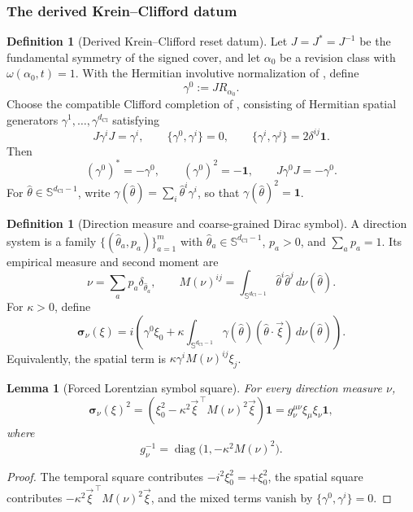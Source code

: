 \documentclass[11pt]{article}
\newtheorem{lemma}[theorem]{Lemma}
\theoremstyle{definition}
\newtheorem{definition}[theorem]{Definition}
\theoremstyle{remark}
\newcommand{\dCl}{d_{\mathrm{Cl}}}
\newcommand{\Sphere}{\mathbb{S}}
\newcommand{\sym}{\boldsymbol{\sigma}}
\newcommand{\one}{\mathbf{1}}
\begin{document}
\subsubsection{The derived Krein--Clifford datum}

\begin{definition}[Derived Krein--Clifford reset datum]
\label{def:krein-clifford}
Let \(J=J^*=J^{-1}\) be the fundamental symmetry of the signed cover, and let
\(\alpha_0\) be a revision class with \(\omega(\alpha_0,t)=1\).  With the
Hermitian involutive normalization of
, define
\[
  \gamma^0:=J R_{\alpha_0}.
\]
Choose the compatible Clifford completion of
, consisting of Hermitian spatial
generators \(\gamma^1,\ldots,\gamma^{\dCl}\) satisfying
\[
  J\gamma^iJ=\gamma^i,
  \qquad
  \{\gamma^0,\gamma^i\}=0,
  \qquad
  \{\gamma^i,\gamma^j\}=2\delta^{ij}\one.
\]
Then
\[
  (\gamma^0)^*=-\gamma^0,
  \qquad
  (\gamma^0)^2=-\one,
  \qquad
  J\gamma^0J=-\gamma^0.
\]
For \(\hat\theta\in\Sphere^{\dCl-1}\), write
\(\gamma(\hat\theta)=\sum_i\hat\theta^i\gamma^i\), so that
\(\gamma(\hat\theta)^2=\one\).
\end{definition}

\begin{definition}[Direction measure and coarse-grained Dirac symbol]
\label{def:dirac-symbol}
A direction system is a family
\(\{(\hat\theta_a,p_a)\}_{a=1}^{m}\) with
\(\hat\theta_a\in\Sphere^{\dCl-1}\), \(p_a>0\), and
\(\sum_a p_a=1\).  Its empirical measure and second moment are
\[
  \nu=\sum_a p_a\delta_{\hat\theta_a},
  \qquad
  M(\nu)^{ij}=\int_{\Sphere^{\dCl-1}}
  \hat\theta^i\hat\theta^j\,d\nu(\hat\theta).
\]
For \(\kappa>0\), define
\[
  \sym_\nu(\xi)
  =i\left(
     \gamma^0\xi_0+
     \kappa\int_{\Sphere^{\dCl-1}}
     \gamma(\hat\theta)(\hat\theta\cdot\vec\xi)
     \,d\nu(\hat\theta)
   \right).
\]
Equivalently, the spatial term is
\(\kappa\gamma^iM(\nu)^{ij}\xi_j\).
\end{definition}

\begin{lemma}[Forced Lorentzian symbol square]
\label{lem:symbol-square}
For every direction measure \(\nu\),
\[
  \sym_\nu(\xi)^2
  =\left(
      \xi_0^2-\kappa^2\vec\xi^{\,\top}M(\nu)^2\vec\xi
    \right)\one
  =g_\nu^{\mu\nu}\xi_\mu\xi_\nu\one,
\]
where
\[
  g_\nu^{-1}=\operatorname{diag}
  \bigl(1,-\kappa^2M(\nu)^2\bigr).
\]
\end{lemma}

\begin{proof}
The temporal square contributes
\(-i^2\xi_0^2=+\xi_0^2\), the spatial square contributes
\(-\kappa^2\vec\xi^{\,\top}M(\nu)^2\vec\xi\), and the mixed terms vanish by
\(\{\gamma^0,\gamma^i\}=0\).
\end{proof}
\end{document}
